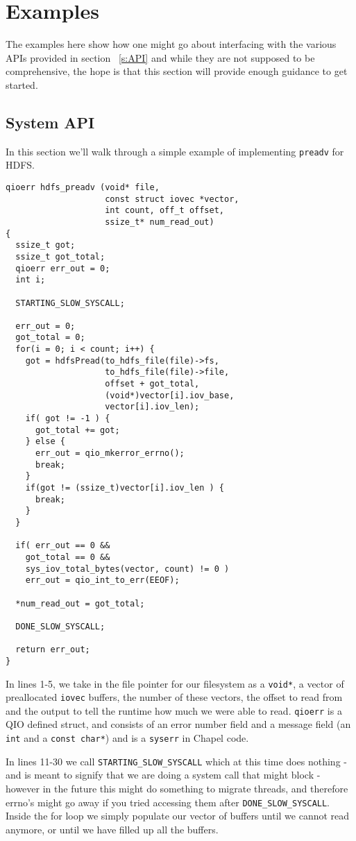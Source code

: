 \section{Examples}\label{s:examples}

The examples here show how one might go about interfacing with the various APIs
provided in section ~\ref{s:API} and while they are not supposed to be comprehensive, the
hope is that this section will provide enough guidance to get started.

\subsection{System API}
In this section we'll walk through a simple example of implementing {\tt preadv} for
HDFS.

\begin{lstlisting}
qioerr hdfs_preadv (void* file, 
                    const struct iovec *vector, 
                    int count, off_t offset, 
                    ssize_t* num_read_out)
{
  ssize_t got;
  ssize_t got_total;
  qioerr err_out = 0;
  int i;

  STARTING_SLOW_SYSCALL;

  err_out = 0;
  got_total = 0;
  for(i = 0; i < count; i++) {
    got = hdfsPread(to_hdfs_file(file)->fs,
                    to_hdfs_file(file)->file, 
                    offset + got_total, 
                    (void*)vector[i].iov_base, 
                    vector[i].iov_len);
    if( got != -1 ) {
      got_total += got;
    } else {
      err_out = qio_mkerror_errno();
      break;
    }
    if(got != (ssize_t)vector[i].iov_len ) {
      break;
    }
  }

  if( err_out == 0 && 
    got_total == 0 && 
    sys_iov_total_bytes(vector, count) != 0 ) 
    err_out = qio_int_to_err(EEOF);

  *num_read_out = got_total;

  DONE_SLOW_SYSCALL;

  return err_out;
}
\end{lstlisting}
In lines 1-5, we take in the file pointer for our filesystem as a {\tt void*}, a vector
of preallocated {\tt iovec} buffers, the number of these vectors, the offset to read from and the
output to tell the runtime how much we were able to read. {\tt qioerr} is a QIO defined
struct, and consists of an error number field and a message field (\ie an {\tt int} and a
{\tt const char*}) and is a {\tt syserr} in Chapel code.

In lines 11-30 we call {\tt STARTING\_SLOW\_SYSCALL} which at this time does nothing - and
is meant to signify that we are doing a system call that might block - however in the
future this might do something to migrate threads, and therefore errno's might go
away if you tried accessing them after {\tt DONE\_SLOW\_SYSCALL}. Inside the for loop we
simply populate our vector of buffers until we cannot read anymore, or until we
have filled up all the buffers. 

